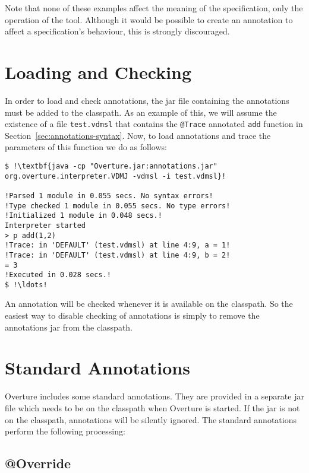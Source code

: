 Note that none of these examples affect the meaning of the
specification, only the operation of the tool. Although it would be
possible to create an annotation to affect a specification's
behaviour, this is strongly discouraged.

\section{Loading and Checking}

In order to load and check annotations, the jar file containing the
annotations must be added to the classpath. As an example of this, we
will assume the existence of a file \lstinline[style=tool]|test.vdmsl|
that contains the \lstinline[language=VDM++]|@Trace| annotated
\lstinline[language=VDM++]|add| function in
Section~\ref{sec:annotations-syntax}. Now, to load annotations and
trace the parameters of this function we do as follows:

\begin{lstlisting}[style=tool,breaklines=true,escapechar=!,frame=tb,label={lst:annotations-cli-ex}]
$ !\textbf{java -cp "Overture.jar:annotations.jar" org.overture.interpreter.VDMJ -vdmsl -i test.vdmsl}!

!Parsed 1 module in 0.055 secs. No syntax errors!
!Type checked 1 module in 0.055 secs. No type errors!
!Initialized 1 module in 0.048 secs.!
Interpreter started
> p add(1,2)
!Trace: in 'DEFAULT' (test.vdmsl) at line 4:9, a = 1!
!Trace: in 'DEFAULT' (test.vdmsl) at line 4:9, b = 2!
= 3
!Executed in 0.028 secs.!
$ !\ldots!
\end{lstlisting}

An annotation will be checked whenever it is available on the
classpath. So the easiest way to disable checking of annotations is
simply to remove the annotations jar from the classpath.

\section{Standard Annotations}\label{sec:standard-annotations}

Overture includes some standard annotations. They are provided in a
separate jar file which needs to be on the classpath when Overture is
started. If the jar is not on the classpath, annotations will be
silently ignored. The standard annotations perform the following
processing:

\subsection{@Override}

